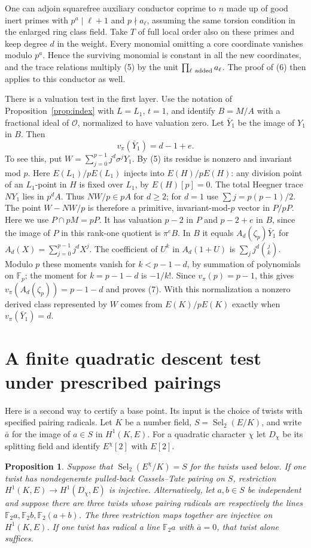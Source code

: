 \documentclass[11pt]{article}
\newtheorem{proposition}[theorem]{Proposition}
\newcommand{\F}{\mathbb F}
\newcommand{\Sel}{\operatorname{Sel}}
\begin{document}
One can adjoin squarefree auxiliary conductor coprime to $n$ made up
of good inert primes with $p^a\mid\ell+1$ and $p\nmid a_\ell$,
assuming the same torsion condition in the enlarged ring class field.
Take $T$ of full local order also on these primes and keep degree $d$
in the weight. Every monomial omitting a core coordinate vanishes
modulo $p^a$. Hence the surviving monomial is constant in all the
new coordinates, and the trace relations multiply (5) by the unit
$\prod_{\ell\ {\rm added}}a_\ell$. The proof of (6) then applies
to this conductor as well.


There is a valuation test in the first layer. Use the notation of
Proposition~\ref{prop:index} with $L=L_1$, $t=1$, and identify
$B=M/A$ with a fractional ideal of $\mathcal O$, normalized to have
valuation zero. Let $\bar Y_1$ be the image of $Y_1$ in $B$. Then
\[
 v_\pi(\bar Y_1)=d-1+e .
 \tag{7}
\]
To see this, put $W=\sum_{j=0}^{p-1}j^d\sigma^jY_1$. By (5) its
residue is nonzero and invariant mod $p$. Here $E(L_1)/pE(L_1)$ injects into $E(H)/pE(H)$:
any division point of an $L_1$-point in $H$ is fixed over $L_1$, by
$E(H)[p]=0$. The total Heegner trace
$NY_1$ lies in $p^dA$. Thus $NW/p\in pA$ for $d\ge2$; for $d=1$ use
$\sum j=p(p-1)/2$. The point $W-NW/p$ is therefore a primitive,
invariant-mod-$p$ vector in $P/pP$. Here we use $P\cap pM=pP$.
It has valuation $p-2$ in $P$ and $p-2+e$ in $B$, since the image
of $P$ in this rank-one quotient is $\pi^e B$. In $B$ it equals
$A_d(\zeta_p)\bar Y_1$ for $A_d(X)=\sum_{j=0}^{p-1}j^d X^j$.
The coefficient of $U^k$ in $A_d(1+U)$ is
$\sum_j j^d\binom{j}{k}$. Modulo $p$ these moments vanish for
$k<p-1-d$, by summation of polynomials on $\mathbb F_p$; the
moment for $k=p-1-d$ is $-1/k!$. Since $v_\pi(p)=p-1$, this gives
$v_\pi(A_d(\zeta_p))=p-1-d$ and proves (7). With this normalization
a nonzero derived class represented by $W$ comes from $E(K)/pE(K)$
exactly when $v_\pi(\bar Y_1)=d$.

\section{A finite quadratic descent test under prescribed pairings}
Here is a second way to certify a base point. Its input is the choice
of twists with specified pairing radicals. Let $K$ be a number field,
$S=\Sel_2(E/K)$, and write $\bar a$ for the image of
$a\in S$ in $H^1(K,E)$. For a quadratic character $\chi$ let $D_\chi$
be its splitting field and identify $E^\chi[2]$ with $E[2]$.

\begin{proposition}\label{prop:quadratic}
Suppose that $\Sel_2(E^\chi/K)=S$ for the twists used below.
If one twist has nondegenerate pulled-back Cassels--Tate pairing on
$S$, restriction $H^1(K,E)\to H^1(D_\chi,E)$ is injective.
Alternatively, let $a,b\in S$ be independent and suppose there are
three twists whose pairing radicals are respectively the lines
$\F_2a,\F_2b,\F_2(a+b)$. The three restriction maps together are
injective on $H^1(K,E)$. If one twist has radical a line
$\F_2a$ with $\bar a=0$, that twist alone suffices.
\end{proposition}
\end{document}

